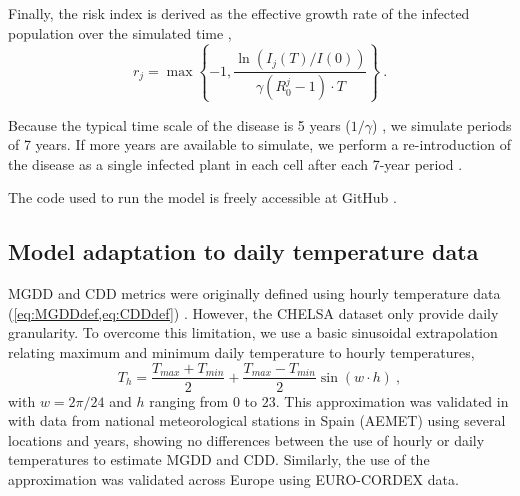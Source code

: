 Finally, the risk index is derived as the effective growth rate of the
infected population over the simulated time \cite{GimenezRomero2022_CommsBio},
\begin{equation}
    r_j=\max\left\{-1, \frac{\ln(I_j(T) / I(0))}{\gamma(R_0^j-1)\cdot
        T}\right\} \ .
\end{equation}

Because the typical time scale of the disease is 5 years ($1/\gamma$)
\cite{Almeida2003}, we simulate periods of 7 years. If more years are available
to simulate, we perform a re-introduction of the disease as a single infected
plant in each cell after each 7-year period
\cite{GimenezRomero2022_CommsBio}.

The code used to run the model is freely accessible at GitHub
\cite{CODE_model}.

\subsection{Model adaptation to daily temperature data}

MGDD and CDD metrics were originally defined using hourly temperature data
(\cref{eq:MGDDdef,eq:CDDdef}) \cite{GimenezRomero2022_CommsBio}. However, the
CHELSA
dataset only provide daily granularity. To overcome this limitation, we use a
basic sinusoidal extrapolation relating maximum and minimum daily temperature
to hourly temperatures,
\begin{equation}
    T_h=\frac{T_{max}+T_{min}}{2} + \frac{T_{max}-T_{min}}{2}\sin(w\cdot h)
    \ ,
\end{equation}
with $w=2\pi/24$ and $h$ ranging from $0$ to $23$. This approximation was
validated in \cite{GimenezRomero2023_PD} with data from national meteorological
stations
in Spain (AEMET) using several locations and years, showing no differences
between the use of hourly or daily temperatures to estimate MGDD and CDD.
Similarly, the use of the approximation was validated across Europe using
EURO-CORDEX data.